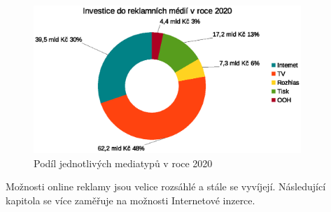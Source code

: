     \begin{figure}[h]
        \centering
        \includegraphics[width=0.9\textwidth]{Figures/pie-chart.eps}

        \caption[Podíl mediatypů v roce 2020]{Podíl jednotlivých mediatypů v roce 2020 \cite{spir:mediatypes}}
        \label{fig:spir-mediatypes}
    \end{figure}

    Možnosti online reklamy jsou velice rozsáhlé a stále se vyvíjejí. Následující kapitola se více zaměřuje na možnosti Internetové inzerce.